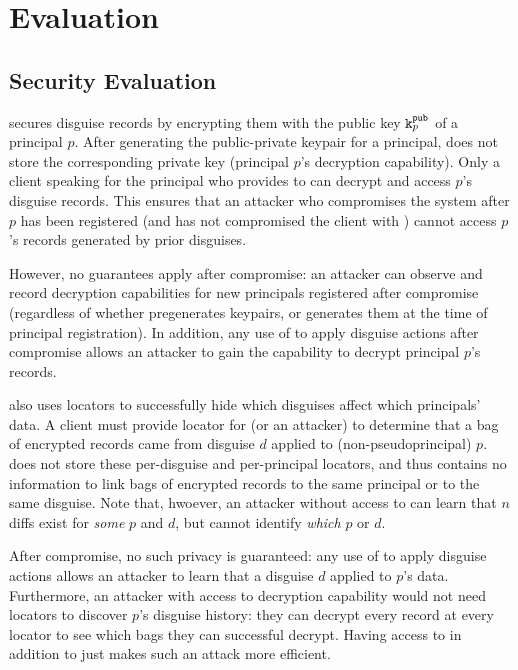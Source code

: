 \section{Evaluation}
\label{s:eval}


\subsection{Security Evaluation}
\label{s:eval-security}

\sys secures disguise records by encrypting them with the public key $\texttt{\ensuremath{\texttt{k}^{\text{pub}}_{p}}}$ of a principal $p$.
After generating the public-private keypair for a principal, \sys does not store the corresponding
private key  (principal $p$'s decryption capability). Only a client speaking for the
principal who provides  to \sys can decrypt and access $p$'s disguise records.
This ensures that an attacker who compromises the system after $p$ has been registered (and has not
compromised the client with ) cannot access $p$'s records generated by prior disguises.

However, no guarantees apply after compromise: an attacker can observe and record decryption
capabilities for new principals registered after compromise (regardless of whether \sys pregenerates
keypairs, or generates them at the time of principal registration). In addition, any use of
 to apply disguise actions after compromise allows an attacker to gain the capability to
decrypt principal $p$'s records.
%

\sys also uses locators to successfully hide which disguises affect which principals' data. A client
must provide locator  for \sys (or an attacker) to determine that a bag of encrypted
records came from disguise $d$ applied to (non-pseudoprincipal) $p$. \sys does not store these
per-disguise and per-principal locators, and thus contains no information to link bags of encrypted
records to the same principal or to the same disguise.  Note that, hwoever, an attacker without
access to  can learn that $n$ diffs exist for \emph{some} $p$ and $d$, but cannot identify
\emph{which} $p$ or $d$.

After compromise, no such privacy is guaranteed: any use of  to apply disguise actions
allows an attacker to learn that a disguise $d$ applied to $p$'s data.  Furthermore, an attacker
with access to decryption capability  would not need locators to discover $p$'s disguise
history: they can decrypt every record at every locator to see which bags they can successful
decrypt. Having access to  in addition to  just makes such an attack more
efficient.

